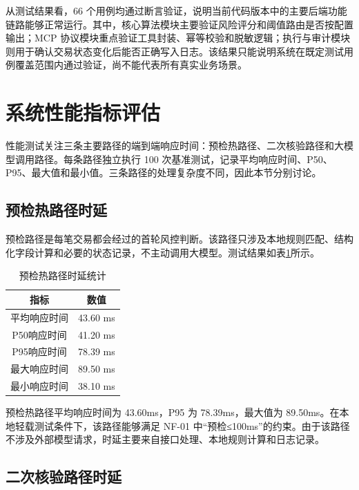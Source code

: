 \documentclass{xduugthesis}
\begin{document}
从测试结果看，66 个用例均通过断言验证，说明当前代码版本中的主要后端功能链路能够正常运行。其中，核心算法模块主要验证风险评分和阈值路由是否按配置输出；MCP 协议模块重点验证工具封装、幂等校验和脱敏逻辑；执行与审计模块则用于确认交易状态变化后能否正确写入日志。该结果只能说明系统在既定测试用例覆盖范围内通过验证，尚不能代表所有真实业务场景。

\section{系统性能指标评估}

性能测试关注三条主要路径的端到端响应时间：预检热路径、二次核验路径和大模型调用路径。每条路径独立执行 100 次基准测试，记录平均响应时间、P50、P95、最大值和最小值。三条路径的处理复杂度不同，因此本节分别讨论。

\subsection{预检热路径时延}

预检路径是每笔交易都会经过的首轮风控判断。该路径只涉及本地规则匹配、结构化字段计算和必要的状态记录，不主动调用大模型。测试结果如表\ref{tab:precheck-latency}所示。

\begin{table}[H]
    \centering
    \caption{预检热路径时延统计}
    \label{tab:precheck-latency}
    \begin{tabular}{|c|c|}
        \hline
        指标 & 数值 \\
        \hline
        平均响应时间 & 43.60 ms \\
        \hline
        P50响应时间 & 41.20 ms \\
        \hline
        P95响应时间 & 78.39 ms \\
        \hline
        最大响应时间 & 89.50 ms \\
        \hline
        最小响应时间 & 38.10 ms \\
        \hline
    \end{tabular}
\end{table}

预检热路径平均响应时间为 43.60ms，P95 为 78.39ms，最大值为 89.50ms。在本地轻载测试条件下，该路径能够满足 NF-01 中“预检≤100ms”的约束。由于该路径不涉及外部模型请求，时延主要来自接口处理、本地规则计算和日志记录。

\subsection{二次核验路径时延}
\end{document}
